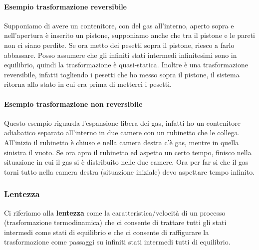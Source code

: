             \paragraph{Esempio trasformazione reversibile}
                Supponiamo di avere un contenitore, con del gas all'interno, aperto sopra e nell'apertura è inserito un pistone, supponiamo anche che tra il pistone e le pareti non ci siano perdite. Se ora metto dei pesetti sopra il pistone, riesco a farlo abbassare. Posso assumere che gli infiniti stati intermedi infinitesimi sono in equilibrio, quindi la trasformazione è quasi-statica. Inoltre è una trasformazione reversibile, infatti togliendo i pesetti che ho messo sopra il pistone, il sistema ritorna allo stato in cui era prima di metterci i pesetti.

            \paragraph{Esempio trasformazione non reversibile}
                Questo esempio riguarda l'espansione libera dei gas, infatti ho un contenitore adiabatico separato all'interno in due camere con un rubinetto che le collega. All'inizio il rubinetto è chiuso e nella camera destra c'è gas, mentre in quella sinistra il vuoto. Se ora apro il rubinetto ed aspetto un certo tempo, finisco nella situazione in cui il gas si è distribuito nelle due camere. Ora per far si che il gas torni tutto nella camera destra (situazione iniziale) devo aspettare tempo infinito.

        \subsubsection{Lentezza}
            Ci riferiamo alla \textbf{lentezza} come la caratteristica/velocità di un processo (trasformazione termodinamica) che ci consente di trattare tutti gli stati intermedi come stati di equilibrio e che ci consente di raffigurare la trasformazione come passaggi su infiniti stati intermedi tutti di equilibrio.

